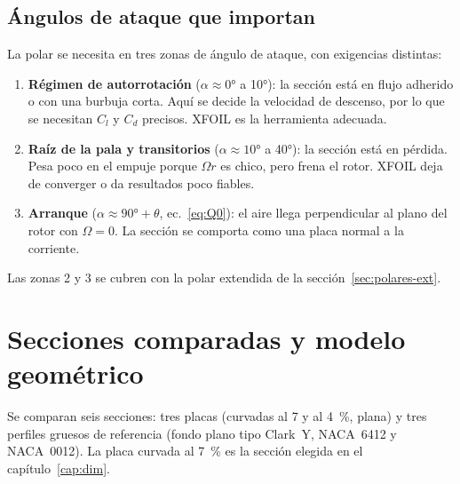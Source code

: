 \subsection{Ángulos de ataque que importan}
La polar se necesita en tres zonas de ángulo de ataque, con exigencias distintas:
\begin{enumerate}
  \item \textbf{Régimen de autorrotación} ($\alpha\approx\ang{0}$ a \ang{10}): la sección
        está en flujo adherido o con una burbuja corta. Aquí se decide la velocidad de
        descenso, por lo que se necesitan $C_l$ y $C_d$ precisos. XFOIL es la herramienta
        adecuada.
  \item \textbf{Raíz de la pala y transitorios} ($\alpha\approx\ang{10}$ a \ang{40}): la
        sección está en pérdida. Pesa poco en el empuje porque $\Omega r$ es chico, pero
        frena el rotor. XFOIL deja de converger o da resultados poco fiables.
  \item \textbf{Arranque} ($\alpha\approx\ang{90}+\theta$, ec.~\ref{eq:Q0}): el aire llega
        perpendicular al plano del rotor con $\Omega=0$. La sección se comporta como una
        placa normal a la corriente.
\end{enumerate}
Las zonas 2 y 3 se cubren con la polar extendida de la
sección~\ref{sec:polares-ext}.

\section{Secciones comparadas y modelo geométrico}\label{sec:polares-geom}

Se comparan seis secciones: tres placas (curvadas al 7 y al \SI{4}{\percent}, plana) y
tres perfiles gruesos de referencia (fondo plano tipo Clark~Y, NACA~6412 y NACA~0012). La
placa curvada al \SI{7}{\percent} es la sección elegida en el capítulo~\ref{cap:dim}.

